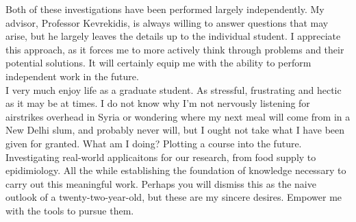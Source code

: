 \documentclass[11pt]{article}
\begin{document}
Both of these investigations have been performed largely independently. My advisor, Professor Kevrekidis, is always willing to answer questions that may arise, but he largely leaves the details up to the individual student. I appreciate this approach, as it forces me to more actively think through problems and their potential solutions. It will certainly equip me with the ability to perform independent work in the future.\\

I very much enjoy life as a graduate student. As stressful, frustrating and hectic as it may be at times. I do not know why I'm not nervously listening for airstrikes overhead in Syria or wondering where my next meal will come from in a New Delhi slum, and probably never will, but I ought not take what I have been given for granted. What am I doing? Plotting a course into the future. Investigating real-world applicaitons for our research, from food supply to epidimiology. All the while establishing the foundation of knowledge necessary to carry out this meaningful work. Perhaps you will dismiss this as the naive outlook of a twenty-two-year-old, but these are my sincere desires. Empower me with the tools to pursue them.
\end{document}
